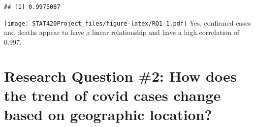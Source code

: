 \documentclass[]{article}
\newenvironment{Shaded}{\begin{snugshade}}{\end{snugshade}}
\newcommand{\DataTypeTok}[1]{\textcolor[rgb]{0.13,0.29,0.53}{#1}}
\newcommand{\KeywordTok}[1]{\textcolor[rgb]{0.13,0.29,0.53}{\textbf{#1}}}
\newcommand{\NormalTok}[1]{#1}
\newcommand{\OperatorTok}[1]{\textcolor[rgb]{0.81,0.36,0.00}{\textbf{#1}}}
\newcommand{\StringTok}[1]{\textcolor[rgb]{0.31,0.60,0.02}{#1}}
\begin{document}
\begin{Shaded}
\end{Shaded}

\begin{verbatim}
## [1] 0.9975087
\end{verbatim}

\begin{Shaded}
\end{Shaded}

\texttt{[image: STAT420Project\_files/figure-latex/RQ1-1.pdf]} Yes,
confirmed cases and deaths appear to have a linear relationship and have
a high correlation of 0.997.

\hypertarget{research-question-2-how-does-the-trend-of-covid-cases-change-based-on-geographic-location}{%
\section{Research Question \#2: How does the trend of covid cases change
based on geographic
location?}\label{research-question-2-how-does-the-trend-of-covid-cases-change-based-on-geographic-location}}
\end{document}
